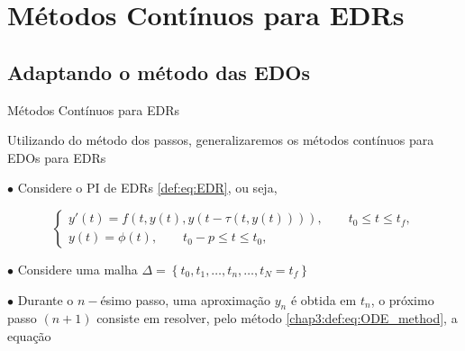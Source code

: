 \documentclass{beamer}
\theoremstyle{plain}
\theoremstyle{definition}
\begin{document}

\section{Métodos Contínuos para EDRs}
\subsection{Adaptando o método das EDOs}

\begin{frame}{Métodos Contínuos para EDRs}

    Utilizando do método dos passos, generalizaremos os métodos contínuos para EDOs para EDRs

    \phantom{aa} $\bullet$ Considere o PI de EDRs \eqref{def:eq:EDR}, ou seja,

    \begin{equation}
        \begin{cases}
            y'(t) = f(t, y(t), y(t - \tau(t, y(t)))), \qquad t_0 \leq t \leq t_f , \\
            y(t) = \phi(t), \qquad t_0 - p \leq t \leq t_0,
        \end{cases}
        \label{chap3:def:EDR}
    \end{equation}


    \phantom{aa} $\bullet$ Considere uma malha \(\Delta=\left\{t_{0}, t_{1}, \ldots, t_{n}, \ldots\right., \left.t_{N}=t_{f}\right\}\) 


    \phantom{aa} $\bullet$ Durante o $n-$ésimo passo, uma aproximação \( y_{n} \) é obtida em \( t_{n} \), o próximo passo \((n+1)\) consiste em resolver, pelo método \ref{chap3:def:eq:ODE_method}, a equação



\end{frame}


\end{document}

